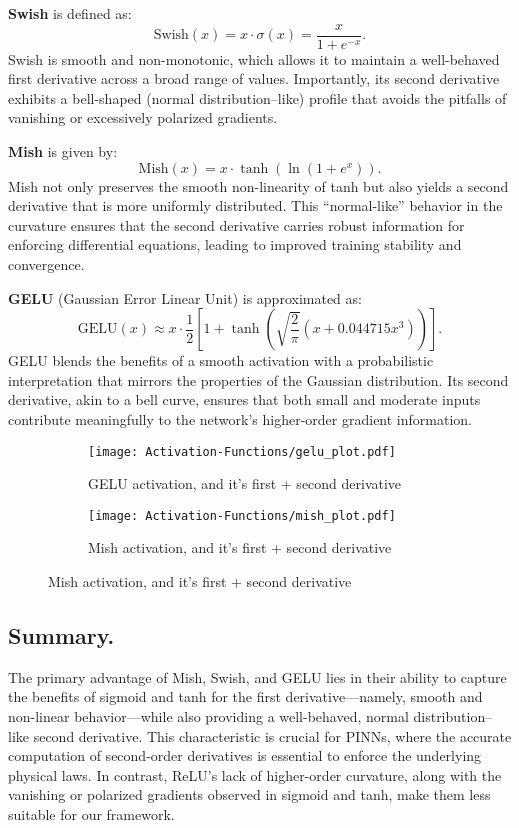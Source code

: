 \textbf{Swish} is defined as:
\[
\text{Swish}(x) = x \cdot \sigma(x) = \frac{x}{1+e^{-x}}.
\]
Swish is smooth and non-monotonic, which allows it to maintain a well-behaved first derivative across a broad range of values. Importantly, its second derivative exhibits a bell-shaped (normal distribution–like) profile that avoids the pitfalls of vanishing or excessively polarized gradients.

\textbf{Mish} is given by:
\[
\text{Mish}(x) = x \cdot \tanh\left(\ln(1+e^x)\right).
\]
Mish not only preserves the smooth non-linearity of tanh but also yields a second derivative that is more uniformly distributed. This “normal-like” behavior in the curvature ensures that the second derivative carries robust information for enforcing differential equations, leading to improved training stability and convergence.

\textbf{GELU} (Gaussian Error Linear Unit) is approximated as:
\[
\text{GELU}(x) \approx x \cdot \frac{1}{2}\left[1 + \tanh\left(\sqrt{\frac{2}{\pi}}(x + 0.044715x^3)\right)\right].
\]
GELU blends the benefits of a smooth activation with a probabilistic interpretation that mirrors the properties of the Gaussian distribution. Its second derivative, akin to a bell curve, ensures that both small and moderate inputs contribute meaningfully to the network's higher-order gradient information.
\begin{figure}[H]
    \centering
    \begin{subfigure}[t]{0.49\textwidth}
        \centering
        \texttt{[image: Activation-Functions/gelu\_plot.pdf]}
        \label{fig:GELU}
        \caption{GELU activation, and it's first + second derivative}
    \end{subfigure}
    \hfill
    \begin{subfigure}[t]{0.49\textwidth}
        \centering
        \texttt{[image: Activation-Functions/mish\_plot.pdf]}
        \label{fig:Mish}
        \caption{Mish activation, and it's first + second derivative}
    \end{subfigure}
\end{figure}
\subsection{Summary.}
The primary advantage of Mish, Swish, and GELU lies in their ability to capture the benefits of sigmoid and tanh for the first derivative—namely, smooth and non-linear behavior—while also providing a well-behaved, normal distribution–like second derivative. This characteristic is crucial for PINNs, where the accurate computation of second-order derivatives is essential to enforce the underlying physical laws. In contrast, ReLU’s lack of higher-order curvature, along with the vanishing or polarized gradients observed in sigmoid and tanh, make them less suitable for our framework.

